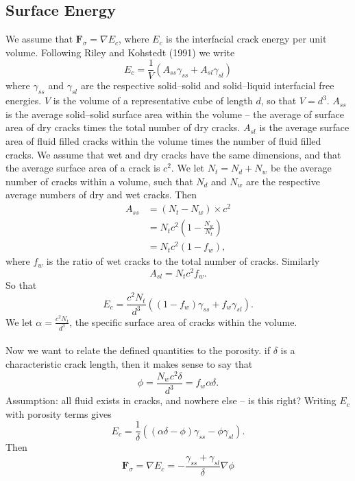 \documentclass[9pt,fleqn,twoside]{article}
\theoremstyle{plain}
\theoremstyle{definition}
\theoremstyle{remark}
\begin{document}
\subsection{Surface Energy}
We assume that $\mathbf{F}_{\sigma} =
\nabla E_c$, where $E_c$ is the interfacial crack energy per unit
volume. Following Riley and Kohstedt (1991) we write
\begin{equation}
E_c = \frac{1}{V} (A_{ss} \gamma_{ss} + A_{sl} \gamma_{sl})
\end{equation}
where $\gamma_{ss}$ and $\gamma_{sl}$ are the respective solid--solid
and solid--liquid interfacial free energies. $V$ is the volume of a
representative cube of length $d$, so that $V=d^3$. $A_{ss}$ is the
average solid--solid surface area within the volume -- the average of
surface area of dry cracks times the total number of dry cracks. $A_{sl}$ is the average surface area of
fluid filled cracks within the volume times the number of fluid filled
cracks. We assume that wet and dry
cracks have the same dimensions, and that the average surface area of
a crack  is $c^2$. We let $N_t = N_d + N_w$ be the average number of cracks within
a volume, such that $N_d$ and $N_w$ are the respective average numbers
of dry and wet cracks. Then
\begin{align}
A_{ss} &= (N_t - N_w) \times c^2 \\
&= N_t c^2 \left( 1 - \frac{N_w}{N_t} \right) \\
&= N_t c^2 ( 1 - f_w),
\end{align}
where $f_w$ is the ratio of wet cracks to the total number of
cracks. Similarly
\begin{equation}
A_{sl} = N_t c^2 f_w . 
\end{equation}
So that
\begin{equation}
E_c = \frac{c^2 N_t}{d^3} \left ( (1 - f_w) \gamma_{ss} + f_w
  \gamma_{sl} \right) .
\end{equation}
We let $\alpha = \frac{c^2 N_t}{d^3}$, the specific surface area of
cracks within the volume.\\
\\
Now we want to relate the defined quantities to the porosity. if
$\delta$ is a characteristic crack length, then it makes sense to say
that
\begin{equation}
\phi = \frac{N_w c^2 \delta}{d^3} = f_w \alpha \delta .
\end{equation}
Assumption: all fluid exists in cracks, and nowhere else -- is this
right? Writing $E_c$ with porosity terms gives
\begin{equation}
E_c = \frac{1}{\delta} \left( (\alpha \delta - \phi) \gamma_{ss} -
  \phi \gamma_{sl} \right).
\end{equation}
Then 
\begin{equation}
\mathbf{F}_{\sigma} = \nabla E_c = - \frac{\gamma_{ss} +
  \gamma_{sl}}{\delta} \nabla \phi
\end{equation}
\end{document}

